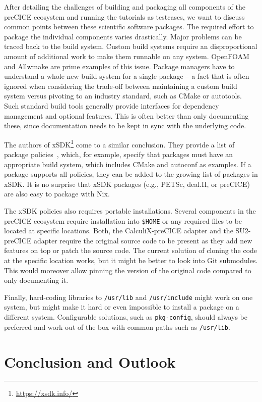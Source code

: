 \documentclass{eceasst}
\begin{document}
After detailing the challenges of building and packaging all components of the preCICE ecosystem and running the tutorials as testcases, we want to discuss common points between these scientific software packages.
The required effort to package the individual components varies drastically. Major problems can be traced back to the build system.
Custom build systems require an disproportional amount of additional work to make them runnable on any system.
OpenFOAM and Allwmake are prime examples of this issue. Package managers have to understand a whole new build system for a single package -- a fact that is often ignored when considering the trade-off between maintaining a custom build system versus pivoting to an industry standard, such as CMake or autotools.
Such standard build tools generally provide interfaces for dependency management and optional features. This is often better than only documenting these, since documentation needs to be kept in sync with the underlying code.

The authors of xSDK\footnote{\url{https://xsdk.info/}} come to a similar conclusion.
They provide a list of package policies~\cite{xSDK2023}, which, for example, specify that packages must have an appropriate build system, which includes CMake and autoconf as examples.
If a package supports all policies, they can be added to the growing list of packages in xSDK.
It is no surprise that xSDK packages (e.g., PETSc, deal.II, or preCICE) are also easy to package with Nix.

The xSDK policies also requires portable installations. Several components in the preCICE ecosystem require installation into \texttt{\$HOME} or any required files to be located at specific locations. Both, the CalculiX-preCICE adapter and the SU2-preCICE adapter require the original source code to be present as they add new features on top or patch the source code.
The current solution of cloning the code at the specific location works, but it might be better to look into Git submodules. This would moreover allow pinning the version of the original code compared to only documenting it.

Finally, hard-coding libraries to \texttt{/usr/lib} and \texttt{/usr/include} might work on one system, but might make it hard or even impossible to install a package on a different system.
Configurable solutions, such as \texttt{pkg-config}, should always be preferred and work out of the box with common paths such as \texttt{/usr/lib}.

\section{Conclusion and Outlook}
\end{document}
